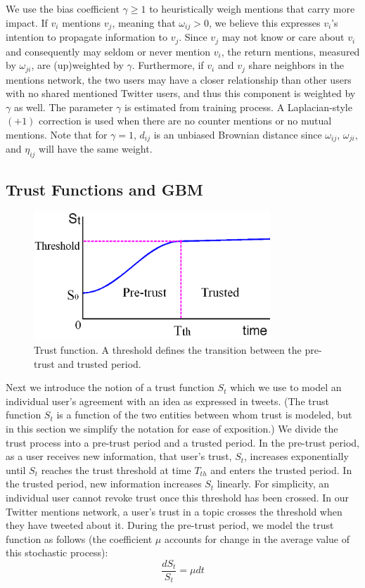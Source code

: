 We use the bias coefficient $\gamma \geq 1$ to heuristically
weigh mentions that carry more impact. If $v_i$ mentions $v_j$, meaning that $\omega_{ij} > 0$, we believe this expresses $v_i$'s intention to propagate information to $v_j$.
Since $v_j$ may not know or care about $v_i$ and consequently may seldom or never mention $v_i$, the return mentions, measured by $\omega_{ji}$, are (up)weighted by $\gamma$.
Furthermore, if $v_i$ and $v_j$ share neighbors in the mentions
network, the two users may have a closer relationship than other users
with no shared mentioned Twitter users, and thus this component
is weighted by $\gamma$ as well. The parameter $\gamma$ is estimated from training process.
A Laplacian-style $(+1)$ correction is used
when there are no counter mentions or no mutual mentions.
Note that for $\gamma = 1$, $d_{ij}$ is an unbiased Brownian distance since $\omega_{ij}$, $\omega_{ji}$, and $\eta_{ij}$ will have the same weight. 

\subsection{Trust Functions and GBM}
\begin{figure}[ht]
\centering
\includegraphics[width=3.5in]{figures/trustFunction.png} %
\caption{Trust function. A threshold defines the transition between the
pre-trust and trusted period.}
\label{fig:subgraph}
\end{figure}

Next we introduce the notion of a
trust function $S_t$ which we use to model an individual user's agreement with an idea as expressed in tweets.
(The trust function $S_t$ is a function of the two entities between whom
trust is modeled, but in this section we simplify the notation for
ease of exposition.)
We divide the trust process into a pre-trust
period and a trusted period.
In the pre-trust period, as a user receives new information, that user's trust, $S_t$, increases exponentially until $S_t$ reaches the trust threshold at time $T_{th}$ and enters the trusted period.
In the trusted period, new information increases $S_t$ linearly. For simplicity, an individual user cannot revoke trust once this threshold has been crossed. In our Twitter mentions network, a user's trust in a topic crosses the threshold when they have tweeted about it. During the pre-trust period, we model the
trust function as follows (the coefficient $\mu$ accounts for change in the average value of this stochastic process):
\begin{equation}\frac{d S_t}{S_t} = \mu {dt}\end{equation}


